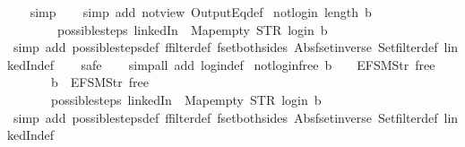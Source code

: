 \begin{isabellebody}
\ \ \isamarkupfalse%
\ simp\isanewline
\ \ \isamarkupfalse%
\ {\isacharparenleft}simp\ add{\isacharcolon}\ not{\isacharunderscore}view\ OutputEq{\isacharunderscore}def{\isacharparenright}%
\endisatagproof
{\isafoldproof}%
%
\isadelimproof
\isanewline
%
\endisadelimproof
\isanewline
{}\isamarkupfalse%
\ not{\isacharunderscore}login{\isacharcolon}\ {\isachardoublequoteopen}length\ b\ {\isasymnoteq}\ {}\ {\isasymLongrightarrow}\isanewline
\ \ \ \ \ \ \ \ possible{\isacharunderscore}steps\ linkedIn\ {}\ Map{\isachardot}empty\ STR\ {\isacharprime}{\isacharprime}login{\isacharprime}{\isacharprime}\ b\ {\isacharequal}\ {\isacharbraceleft}{\isacharbar}{\isacharbar}{\isacharbraceright}{\isachardoublequoteclose}\isanewline
%
\isadelimproof
\ \ %
\endisadelimproof
%
\isatagproof
{}\isamarkupfalse%
\ {\isacharparenleft}simp\ add{\isacharcolon}\ possible{\isacharunderscore}steps{\isacharunderscore}def\ ffilter{\isacharunderscore}def\ fset{\isacharunderscore}both{\isacharunderscore}sides\ Abs{\isacharunderscore}fset{\isacharunderscore}inverse\ Set{\isachardot}filter{\isacharunderscore}def\ linkedIn{\isacharunderscore}def{\isacharparenright}\isanewline
\ \ \isamarkupfalse%
\ safe\isanewline
\ \ \isamarkupfalse%
\ {\isacharparenleft}simp{\isacharunderscore}all\ add{\isacharcolon}\ login{\isacharunderscore}def{\isacharparenright}%
\endisatagproof
{\isafoldproof}%
%
\isadelimproof
\isanewline
%
\endisadelimproof
\isanewline
{}\isamarkupfalse%
\ not{\isacharunderscore}login{\isacharunderscore}free{\isacharcolon}\ {\isachardoublequoteopen}b\ {\isacharbang}\ {}\ {\isacharequal}\ EFSM{\isachardot}Str\ {\isacharprime}{\isacharprime}free{\isacharprime}{\isacharprime}\ {\isasymLongrightarrow}\isanewline
\ \ \ \ \ \ \ b\ {\isasymnoteq}\ {\isacharbrackleft}EFSM{\isachardot}Str\ {\isacharprime}{\isacharprime}free{\isacharprime}{\isacharprime}{\isacharbrackright}\ {\isasymLongrightarrow}\isanewline
\ \ \ \ \ \ \ possible{\isacharunderscore}steps\ linkedIn\ {}\ Map{\isachardot}empty\ STR\ {\isacharprime}{\isacharprime}login{\isacharprime}{\isacharprime}\ b\ {\isacharequal}\ {\isacharbraceleft}{\isacharbar}{\isacharbar}{\isacharbraceright}{\isachardoublequoteclose}\isanewline
%
\isadelimproof
\ \ %
\endisadelimproof
%
\isatagproof
{}\isamarkupfalse%
\ {\isacharparenleft}simp\ add{\isacharcolon}\ possible{\isacharunderscore}steps{\isacharunderscore}def\ ffilter{\isacharunderscore}def\ fset{\isacharunderscore}both{\isacharunderscore}sides\ Abs{\isacharunderscore}fset{\isacharunderscore}inverse\ Set{\isachardot}filter{\isacharunderscore}def\ linkedIn{\isacharunderscore}def{\isacharparenright}\isanewline

\end{isabellebody}
